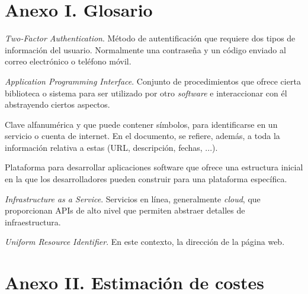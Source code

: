 \documentclass{article}
\begin{document}
\pagebreak

\section*{Anexo I. Glosario}

\begin{description}
    \setlength\itemsep{0em}
    \item[2FA] \textit{Two-Factor Authentication}. Método de autentificación que requiere dos tipos de información del usuario. Normalmente una contraseña y un código enviado al correo electrónico o teléfono móvil.
    \item[API] \textit{Application Programming Interface}. Conjunto de procedimientos que ofrece cierta biblioteca o sistema para ser utilizado por otro \textit{software} e interaccionar con él abstrayendo ciertos aspectos.
    \item[Contraseña] Clave alfanumérica y que puede contener símbolos, para identificarse en un servicio o cuenta de internet. En el documento, se refiere, además, a toda la información relativa a estas (URL, descripción, fechas, ...).
    \item[Framework] Plataforma para desarrollar aplicaciones software que ofrece una estructura inicial en la que los desarrolladores pueden construir para una plataforma específica. 
    \item[IaaS] \textit{Infrastructure as a Service}. Servicios en línea, generalmente \textit{cloud}, que proporcionan APIs de alto nivel que permiten abstraer detalles de infraestructura.
    \item[URL] \textit{Uniform Resource Identifier}. En este contexto, la dirección de la página web. 
\end{description}

\section*{Anexo II. Estimación de costes}

\end{document}

